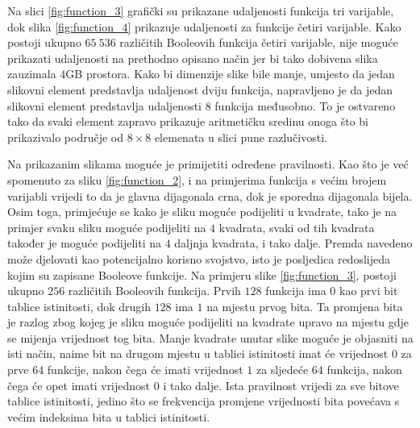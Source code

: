 Na slici \ref{fig:function_3} grafički su prikazane udaljenosti funkcija tri varijable, dok slika \ref{fig:function_4} prikazuje udaljenosti za funkcije četiri varijable. 
Kako postoji ukupno $65\:536$ različitih Booleovih funkcija četiri varijable, nije moguće prikazati udaljenosti na prethodno opisano način jer bi tako dobivena slika zauzimala $4$GB prostora.
Kako bi dimenzije slike bile manje, umjesto da jedan slikovni element predstavlja udaljenost dviju funkcija, napravljeno je da jedan slikovni element predstavlja udaljenosti $8$ funkcija međusobno.
To je ostvareno tako da svaki element zapravo prikazuje aritmetičku sredinu onoga što bi prikazivalo područje od $8\times8$ elemenata u slici pune razlučivosti.

Na prikazanim slikama moguće je primijetiti određene pravilnosti.
Kao što je već spomenuto za sliku \ref{fig:function_2}, i na primjerima funkcija s većim brojem varijabli vrijedi to da je glavna dijagonala crna, dok je sporedna dijagonala bijela.
Osim toga, primjećuje se kako je sliku moguće podijeliti u kvadrate, tako je na primjer svaku sliku moguće podijeliti na $4$ kvadrata, svaki od tih kvadrata također je moguće podijeliti na $4$ daljnja kvadrata, i tako dalje.
Premda navedeno može djelovati kao potencijalno korisno svojstvo, isto je posljedica redoslijeda kojim su zapisane Booleove funkcije.
Na primjeru slike \ref{fig:function_3}, postoji ukupno $256$ različitih Booleovih funkcija.
Prvih $128$ funkcija ima $0$ kao prvi bit tablice istinitosti, dok drugih $128$ ima $1$ na mjestu prvog bita.
Ta promjena bita je razlog zbog kojeg je sliku moguće podijeliti na kvadrate upravo na mjestu gdje se mijenja vrijednost tog bita.
Manje kvadrate unutar slike moguće je objasniti na isti način, naime bit na drugom mjestu u tablici istinitosti imat će vrijednost $0$ za prve $64$ funkcije, nakon čega će imati vrijednost $1$ za sljedeće $64$ funkcija, nakon čega će opet imati vrijednost $0$ i tako dalje.
Ista pravilnost vrijedi za sve bitove tablice istinitosti, jedino što se frekvencija promjene vrijednosti bita povećava s većim indeksima bita u tablici istinitosti.


